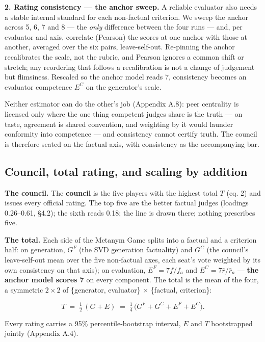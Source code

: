 \documentclass{article}
\begin{document}
\textbf{2. Rating consistency --- the anchor sweep.} A reliable evaluator also needs a stable internal standard for each non-factual criterion. We sweep the anchor across 5, 6, 7 and 8 --- the \emph{only} difference between the four runs --- and, per evaluator and axis, correlate (Pearson) the scores at one anchor with those at another, averaged over the six pairs, leave-self-out. Re-pinning the anchor recalibrates the scale, not the rubric, and Pearson ignores a common shift or stretch; any reordering that follows a recalibration is not a change of judgement but flimsiness. Rescaled so the anchor model reads 7, consistency becomes an evaluator competence \(E^{C}\) on the generator's scale.

Neither estimator can do the other's job (Appendix A.8): peer centrality is licensed only where the one thing competent judges share is the truth --- on taste, agreement is shared convention, and weighting by it would launder conformity into competence --- and consistency cannot certify truth. The council is therefore seated on the factual axis, with consistency as the accompanying bar.

\subsection{Council, total rating, and scaling by addition}\label{council-total-rating-and-scaling-by-addition}

\textbf{The council.} The \textbf{council} is the five players with the highest total \(T\) (eq. 2) and issues every official rating. The top five are the better factual judges (loadings 0.26--0.61, \S{}4.2); the sixth reads 0.18; the line is drawn there; nothing prescribes five.

\textbf{The total.} Each side of the Metanym Game splits into a factual and a criterion half: on generation, \(G^{F}\) (the SVD generation factuality) and \(G^{C}\) (the council's leave-self-out mean over the five non-factual axes, each seat's vote weighted by its own consistency on that axis); on evaluation, \(E^{F} = 7f/f_a\) and \(E^{C} = 7\bar r/\bar r_a\) --- \textbf{the anchor model scores 7} on every component. The total is the mean of the four, a symmetric \(2\times2\) of \{generator, evaluator\} \ensuremath{\times} \{factual, criterion\}:

\[T \;=\; \tfrac12\,(G+E) \;=\; \tfrac14\,\big(G^{F}+G^{C}+E^{F}+E^{C}\big). \tag{2}\]

Every rating carries a 95\% percentile-bootstrap interval, \(E\) and \(T\) bootstrapped jointly (Appendix A.4).
\end{document}
